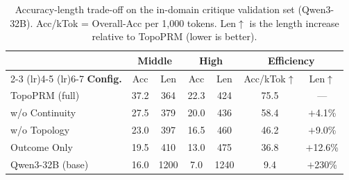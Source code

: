 \begin{table}[H]
\centering
\small
\caption{Accuracy-length trade-off on the in-domain critique validation set
(Qwen3-32B). Acc/kTok = Overall-Acc per 1,000 tokens. Len$\uparrow$ is the
length increase relative to TopoPRM (lower is better).}
\label{tab:ablation_length}
\setlength{\tabcolsep}{4pt}
\begin{tabular}{@{}l cc cc cc@{}}
\toprule
& \multicolumn{2}{c}{\textbf{Middle}}
& \multicolumn{2}{c}{\textbf{High}}
& \multicolumn{2}{c}{\textbf{Efficiency}} \\
\cmidrule(lr){2-3} \cmidrule(lr){4-5} \cmidrule(lr){6-7}
\textbf{Config.}
  & Acc & Len & Acc & Len & Acc/kTok$\uparrow$ & Len$\uparrow$ \\
\midrule
\rowcolor{blue!6}
TopoPRM (full)
  & 37.2 & 364 & 22.3 & 424 & 75.5 & --- \\
\quad w/o Continuity
  & 27.5 & 379 & 20.0 & 436 & 58.4 & $+$4.1\% \\
\quad w/o Topology
  & 23.0 & 397 & 16.5 & 460 & 46.2 & $+$9.0\% \\
Outcome Only
  & 19.5 & 410 & 13.0 & 475 & 36.8 & $+$12.6\% \\
\midrule
Qwen3-32B (base)
  & 16.0 & 1200 & 7.0 & 1240 & 9.4 & $+$230\% \\
\bottomrule
\end{tabular}
\end{table}
